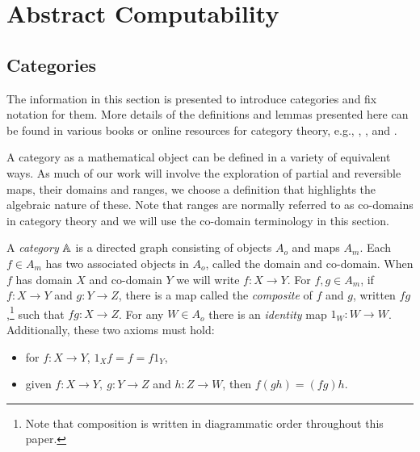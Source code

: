 
\chapter{Abstract Computability}\label{chap:abstract_computability}

%

\section{Categories}
\label{sec:categories}

The information in this section is presented to introduce categories and fix notation for them. More
details of the definitions and lemmas presented here can be found in various books or online
resources for category theory, e.g., \cite{maclan97:categorieswrkmath}, \cite{cockett2009:ctcs},
\cite{barr:ctcs} and \cite{various:nlab}.

A category as a mathematical object can be defined in a variety of equivalent ways. As much of our
work will involve the exploration of partial and reversible maps, their domains and ranges, we
choose a definition that highlights the algebraic nature of these. Note that ranges are normally
referred to as co-domains in category theory and we will use the co-domain terminology in this
section.

\begin{definition}\label{def:category}
  A \emph{category} $\mathbb{A}$ is a directed graph consisting of objects $A_o$ and maps $A_m$. Each $f\in
  A_m$ has two associated objects in $A_o$, called the domain and co-domain. When $f$ has domain $X$
  and co-domain $Y$ we will write $f:X \to Y$. For $f, g \in A_m$, if $f:X\to Y$ and $g:Y \to Z$,
  there is a map called the \emph{composite} of $f$ and $g$, written $f g$,\footnote{Note that
    composition is written in diagrammatic order throughout this paper.} such that $f g:X \to Z$.
  For any $W \in A_o$ there is an \emph{identity} map $1_W:W \to W$. Additionally, these two axioms
  must hold:
  \begin{itemize}
    \item[\catone] for $f:X \to Y$, $1_X f = f = f 1_Y$,
    \item[\cattwo] given $f:X \to Y,\ g:Y \to Z$ and $h: Z\to W$, then $f (g h) = (f g) h$.
  \end{itemize}

\end{definition}

